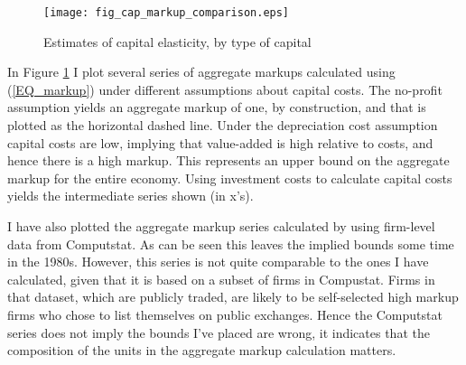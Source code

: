 \documentclass[11pt]{article}
\begin{document}
\begin{figure}[!htb]
\begin{center}
\caption{Estimates of capital elasticity, by type of capital}
\label{FIG_markup}
\texttt{[image: fig\_cap\_markup\_comparison.eps]}
\end{center}
\vspace{-.5cm}
\end{figure}

In Figure \ref{FIG_markup} I plot several series of aggregate markups calculated using (\ref{EQ_markup}) under different assumptions about capital costs. The no-profit assumption yields an aggregate markup of one, by construction, and that is plotted as the horizontal dashed line. Under the depreciation cost assumption capital costs are low, implying that value-added is high relative to costs, and hence there is a high markup. This represents an upper bound on the aggregate markup for the entire economy. Using investment costs to calculate capital costs yields the intermediate series shown (in x's).

I have also plotted the aggregate markup series calculated by \cite{edmondetal2018} using firm-level data from Computstat. As can be seen this leaves the implied bounds some time in the 1980s. However, this series is not quite comparable to the ones I have calculated, given that it is based on a subset of firms in Compustat. Firms in that dataset, which are publicly traded, are likely to be self-selected high markup firms who chose to list themselves on public exchanges. Hence the Computstat series does not imply the bounds I've placed are wrong, it indicates that the composition of the units in the aggregate markup calculation matters.



\onehalfspacing
{\small


}
\end{document}
